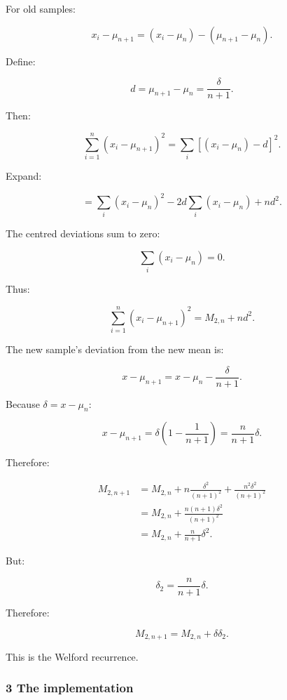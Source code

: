 For old samples:

\[
 x_i-\mu_{n+1} = (x_i-\mu_n)-(\mu_{n+1}-\mu_n).
\]

Define:

\[
 d=\mu_{n+1}-\mu_n=\frac{\delta}{n+1}.
\]

Then:

\[
 \sum_{i=1}^{n}(x_i-\mu_{n+1})^2 = \sum_i[(x_i-\mu_n)-d]^2.
\]

Expand:

\[
 = \sum_i(x_i-\mu_n)^2 - 2d\sum_i(x_i-\mu_n) + nd^2.
\]

The centred deviations sum to zero:

\[
 \sum_i(x_i-\mu_n)=0.
\]

Thus:

\[
 \sum_{i=1}^{n}(x_i-\mu_{n+1})^2 = M_{2,n}+nd^2.
\]

The new sample's deviation from the new mean is:

\[
 x-\mu_{n+1} = x-\mu_n-\frac{\delta}{n+1}.
\]

Because \(\delta=x-\mu_n\):

\[
 x-\mu_{n+1} = \delta\left(1-\frac1{n+1}\right) = \frac{n}{n+1}\delta.
\]

Therefore:

\[
 \begin{aligned} M_{2,n+1} &= M_{2,n} +n\frac{\delta^2}{(n+1)^2} +\frac{n^2\delta^2}{(n+1)^2}\\ &= M_{2,n} +\frac{n(n+1)\delta^2}{(n+1)^2}\\ &= M_{2,n}+\frac{n}{n+1}\delta^2. \end{aligned}
\]

But:

\[
 \delta_2=\frac{n}{n+1}\delta.
\]

Therefore:

\[
 \boxed{ M_{2,n+1} = M_{2,n}+\delta\delta_2 }.
\]

This is the Welford recurrence.

\subsubsection{3 The implementation}\label{02-foundations-ii-ch030-the-implementation}

\hypertarget{02-foundations-ii-ch030-the-implementation}{}

